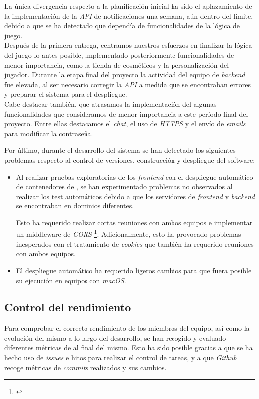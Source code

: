 \documentclass[11pt, a4paper, titlepage]{article}
\begin{document}
La única divergencia respecto a la planificación inicial ha sido el aplazamiento de la implementación de la \textit{API} de notificaciones una semana, aún dentro del límite, debido a que se ha detectado que dependía de funcionalidades de la lógica de juego. \\

Después de la primera entrega, centramos nuestros esfuerzos en finalizar la lógica del juego lo antes posible, implementado posteriormente funcionalidades de menor importancia, como la tienda de cosméticos y la personalización del jugador. Durante la etapa final del proyecto la actividad del equipo de \textit{backend} fue elevada, al ser necesario corregir la \textit{API} a medida que se encontraban errores y preparar el sistema para el despliegue. \\

Cabe destacar también, que atrasamos la implementación del algunas funcionalidades que consideramos de menor importancia a este período final del proyecto. Entre ellas destacamos el \textit{chat}, el uso de \textit{HTTPS} y el envío de \textit{emails} para modificar la contraseña.

\newpage

Por último, durante el desarrollo del sistema se han detectado los siguientes problemas respecto al control de versiones, construcción y despliegue del software:
\begin{itemize}
    \item Al realizar pruebas exploratorias de los \textit{frontend} con el despliegue automático de contenedores de , se han experimentado problemas no observados al realizar los test automáticos debido a que los servidores de \textit{frontend} y \textit{backend} se encontraban en dominios diferentes.

    Esto ha requerido realizar cortas reuniones con ambos equipos e implementar un middleware de \textit{CORS} \footnote{\href{https://developer.mozilla.org/en-US/docs/Web/HTTP/CORS}{}}. Adicionalmente, esto ha provocado problemas inesperados con el tratamiento de \textit{cookies} que también ha requerido reuniones con ambos equipos.

    \item El despliegue automático ha requerido ligeros cambios para que fuera posible su ejecución en equipos con \textit{macOS}.
\end{itemize}

\subsection{Control del rendimiento}
Para comprobar el correcto rendimiento de los miembros del equipo, así como la evolución del mismo a lo largo del desarrollo, se han recogido y evaluado diferentes métricas de  al final del mismo. Esto ha sido posible gracias a que se ha hecho uso de \textit{issues} e hitos para realizar el control de tareas, y a que \textit{Github} recoge métricas de \textit{commits} realizados y sus cambios.
\end{document}
